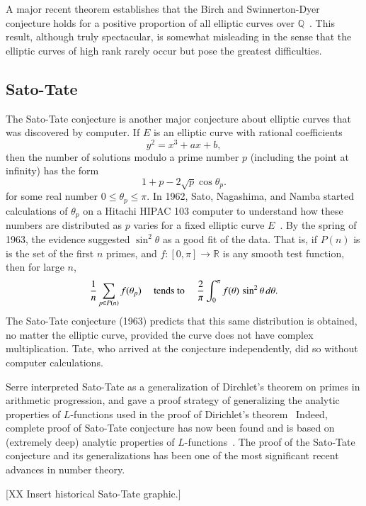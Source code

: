 \documentclass{llncs}
\newcommand{\ring}[1]{\mathbb{#1}}
\begin{document}
A major recent theorem establishes that the Birch and Swinnerton-Dyer
conjecture holds for a positive proportion of all elliptic curves over
$\ring{Q}$~\cite{BS:2010}.  This result, although truly spectacular, is
somewhat misleading in the sense that the elliptic curves of high rank rarely
occur but pose the greatest difficulties.





\subsection{Sato-Tate}

The Sato-Tate conjecture is another major conjecture about elliptic
curves that was discovered by computer.  If $E$ is an elliptic curve
with rational coefficients
\[
y^2 = x^3 + a x + b,
\]
then the number of solutions modulo a prime number $p$ (including the
point at infinity) has the form
\[
1 + p - 2\sqrt{p}\cos\theta_p.
\]
for some real number $0\le \theta_p\le \pi$.  In 1962, Sato,
Nagashima, and Namba started calculations  of $\theta_p$ on a Hitachi
HIPAC 103 computer to understand how these numbers are distributed as
$p$ varies for a fixed elliptic curve $E$~\cite{Sch}.  By the spring of 1963, the
evidence suggested  $\sin^2\theta$ as a good fit of the data.
That is, if $P(n)$ is is the set of the first $n$ primes, and
$f:[0,\pi]\to\ring{R}$ is any smooth test function, then for large
$n$,
\[
\frac{1}{n}\sum_{p\in P(n)} f(\theta_p) \quad\hbox{ tends to }\quad
\frac{2}{\pi}\int_0^\pi f(\theta)\,\sin^2\theta\,d\theta.
\]
The Sato-Tate conjecture (1963) predicts that this same distribution is
obtained, no matter the elliptic curve, provided the curve does not
have complex multiplication.  Tate, who arrived at the conjecture
independently, did so without computer calculations.

Serre interpreted Sato-Tate as a generalization of Dirchlet's
theorem on primes in arithmetic progression, and gave a proof strategy
of generalizing the analytic properties of $L$-functions used in
the proof of Dirichlet's theorem~\cite{Se68}  Indeed, complete proof of Sato-Tate
conjecture has now been found and is based on (extremely deep)
analytic properties of $L$-functions~\cite{Car:Bourbaki}.
The proof of the Sato-Tate conjecture and its generalizations has been
one of the most significant recent advances in number theory.

[XX Insert historical Sato-Tate graphic.]

\end{document}
